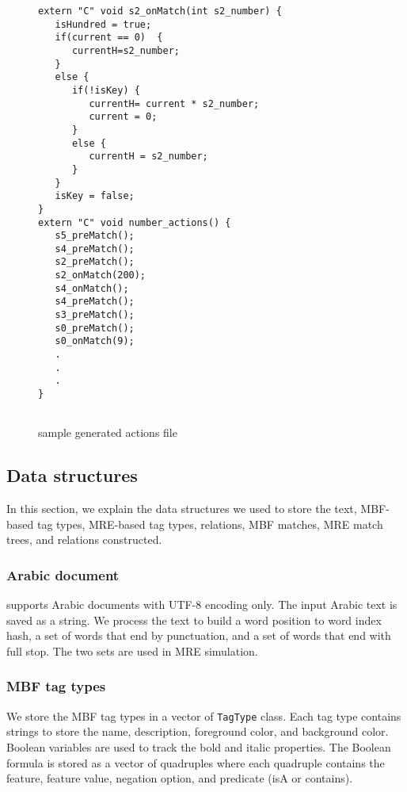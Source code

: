 \begin{figure}[h!]
\begin{multicols}{2}
\begin{Verbatim}[fontsize=\relsize{-2}] 
extern "C" void s2_onMatch(int s2_number) {
   isHundred = true;
   if(current == 0)  {
      currentH=s2_number;
   }
   else {
      if(!isKey) {
         currentH= current * s2_number;
         current = 0;
      }
      else {
         currentH = s2_number;
      }
   }
   isKey = false;
}
extern "C" void number_actions() {
   s5_preMatch();
   s4_preMatch();
   s2_preMatch();
   s2_onMatch(200);
   s4_onMatch();
   s4_preMatch();
   s3_preMatch();
   s0_preMatch();
   s0_onMatch(9);
   .
   .
   .
}


\end{Verbatim}
\end{multicols}
\caption{sample generated actions file}
\label{fig:generatedactions}
\end{figure}

\subsection{Data structures}

In this section, we explain the data structures we used to store the text, MBF-based tag types, 
MRE-based tag types, relations, MBF matches, MRE match trees, and relations constructed.

\subsubsection{Arabic document}

\framework supports Arabic documents with UTF-8 encoding only. 
The input Arabic text is saved as a string. 
We process the text to build a word position to word index hash, 
a set of words that end by punctuation, and a set of words that end with full stop. 
The two sets are used in MRE simulation.

\subsubsection{MBF tag types}

We store the MBF tag types in a vector of {\tt TagType} class. 
Each tag type contains strings to store the name, description, foreground color, and background color. 
Boolean variables are used to track the bold and italic properties. 
The Boolean formula is stored as a vector of quadruples where each quadruple contains the feature, feature value, negation option, and predicate (isA or contains).

